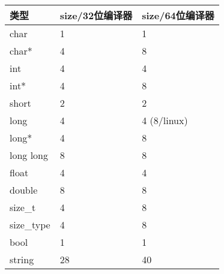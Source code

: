 \documentclass[letterpaper,10pt,english]{sphinxmanual}
\begin{document}
\begin{savenotes}\sphinxattablestart
\centering
{}
\label{\detokenize{cpp/03_typeSize:id4}}
\sphinxaftercaption
\begin{tabulary}{\linewidth}[t]{|T|T|T|}
\hline
\sphinxstyletheadfamily 
类型
&\sphinxstyletheadfamily 
size/32位编译器
&\sphinxstyletheadfamily 
size/64位编译器
\\
\hline
char
&
1
&
1
\\
\hline
char*
&
4
&
8
\\
\hline
int
&
4
&
4
\\
\hline
int*
&
4
&
8
\\
\hline
short
&
2
&
2
\\
\hline
long
&
4
&
4 (8/linux)
\\
\hline
long*
&
4
&
8
\\
\hline
long long
&
8
&
8
\\
\hline
float
&
4
&
4
\\
\hline
double
&
8
&
8
\\
\hline
size\_t
&
4
&
8
\\
\hline
size\_type
&
4
&
8
\\
\hline
bool
&
1
&
1
\\
\hline
string
&
28
&
40
\\
\hline
\end{tabulary}
\par
\sphinxattableend\end{savenotes}
\end{document}
